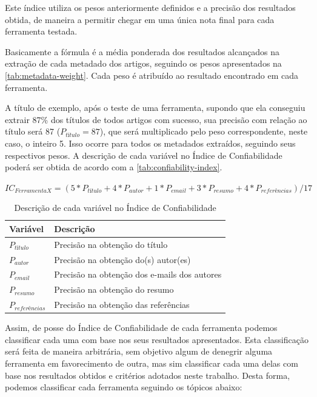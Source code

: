 Este índice utiliza os pesos anteriormente definidos e a precisão dos resultados obtida, de maneira a permitir chegar em uma única nota final para cada ferramenta testada.

Basicamente a fórmula é a média ponderada dos resultados alcançados na extração de cada metadado dos artigos, seguindo os pesos apresentados na \autoref{tab:metadata-weight}. Cada peso é atribuído ao resultado encontrado em cada ferramenta. 

A título de exemplo, após o teste de uma ferramenta, supondo que ela conseguiu extrair 87\% dos títulos de todos artigos com sucesso, sua precisão com relação ao título será 87 ($P_{título}=87$), que será multiplicado pelo peso correspondente, neste caso, o inteiro 5. Isso ocorre para todos os metadados extraídos, seguindo seus respectivos pesos. A descrição de cada variável no Índice de Confiabilidade poderá ser obtida de acordo com a \autoref{tab:confiability-index}.

\begin{center}
    $ IC_{Ferramenta X}=(5*P_{título}+4*P_{autor}+1*P_{email}+3*P_{resumo}+4*P_{referências}) / 17 $
\end{center}

\begin{table}
    \caption{Descrição de cada variável no Índice de Confiabilidade}
    \begin{center}
        \begin{tabular}{|p{3cm}|p{8cm}|}
            \hline \textbf{Variável} & \textbf{Descrição}\\ 
            \hline $P_{título}$ & Precisão na obtenção do título \\
            \hline $P_{autor}$ & Precisão na obtenção do(s) autor(es)\\
            \hline $P_{email}$ & Precisão na obtenção dos e-mails dos autores \\
            \hline $P_{resumo}$ & Precisão na obtenção do resumo \\
            \hline $P_{referências}$ & Precisão na obtenção das referências \\
            \hline 
        \end{tabular} 
    \end{center}
    \label{tab:confiability-index}
\end{table}

\newpage

Assim, de posse do Índice de Confiabilidade de cada ferramenta podemos classificar cada uma com base nos seus resultados apresentados. Esta classificação será feita de maneira arbitrária, sem objetivo algum de denegrir alguma ferramenta em favorecimento de outra, mas sim classificar cada uma delas com base nos resultados obtidos e critérios adotados neste trabalho. Desta forma, podemos classificar cada ferramenta seguindo os tópicos abaixo:

